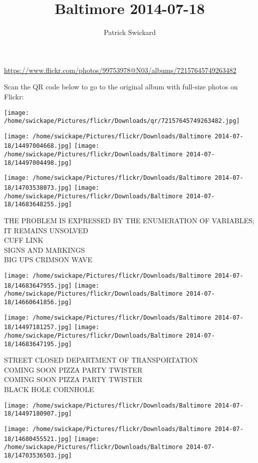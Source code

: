 \documentclass[10pt,letterpaper]{article}
\title{Baltimore 2014-07-18}
\author{Patrick Swickard}
\date{}
\begin{document}
\maketitle

\url{https://www.flickr.com/photos/99753978@N03/albums/72157645749263482}

Scan the QR code below to go to the original album with full-size photos on Flickr:

\texttt{[image: /home/swickape/Pictures/flickr/Downloads/qr/72157645749263482.jpg]}
\pagebreak

\texttt{[image: /home/swickape/Pictures/flickr/Downloads/Baltimore 2014-07-18/14497004668.jpg]}
\texttt{[image: /home/swickape/Pictures/flickr/Downloads/Baltimore 2014-07-18/14497004498.jpg]}

\texttt{[image: /home/swickape/Pictures/flickr/Downloads/Baltimore 2014-07-18/14703538073.jpg]}
\texttt{[image: /home/swickape/Pictures/flickr/Downloads/Baltimore 2014-07-18/14683648255.jpg]}

THE PROBLEM IS EXPRESSED BY THE ENUMERATION OF VARIABLES; IT REMAINS UNSOLVED\\
CUFF LINK\\
SIGNS AND MARKINGS\\
BIG UPS CRIMSON WAVE
\pagebreak

\texttt{[image: /home/swickape/Pictures/flickr/Downloads/Baltimore 2014-07-18/14683647955.jpg]}
\texttt{[image: /home/swickape/Pictures/flickr/Downloads/Baltimore 2014-07-18/14660641856.jpg]}

\texttt{[image: /home/swickape/Pictures/flickr/Downloads/Baltimore 2014-07-18/14497181257.jpg]}
\texttt{[image: /home/swickape/Pictures/flickr/Downloads/Baltimore 2014-07-18/14683647195.jpg]}

STREET CLOSED DEPARTMENT OF TRANSPORTATION\\
COMING SOON PIZZA PARTY TWISTER\\
COMING SOON PIZZA PARTY TWISTER\\
BLACK HOLE CORNHOLE
\pagebreak

\texttt{[image: /home/swickape/Pictures/flickr/Downloads/Baltimore 2014-07-18/14497180907.jpg]}

\vspace{0.25in}
\texttt{[image: /home/swickape/Pictures/flickr/Downloads/Baltimore 2014-07-18/14680455521.jpg]}
\texttt{[image: /home/swickape/Pictures/flickr/Downloads/Baltimore 2014-07-18/14703536503.jpg]}
\end{document}
